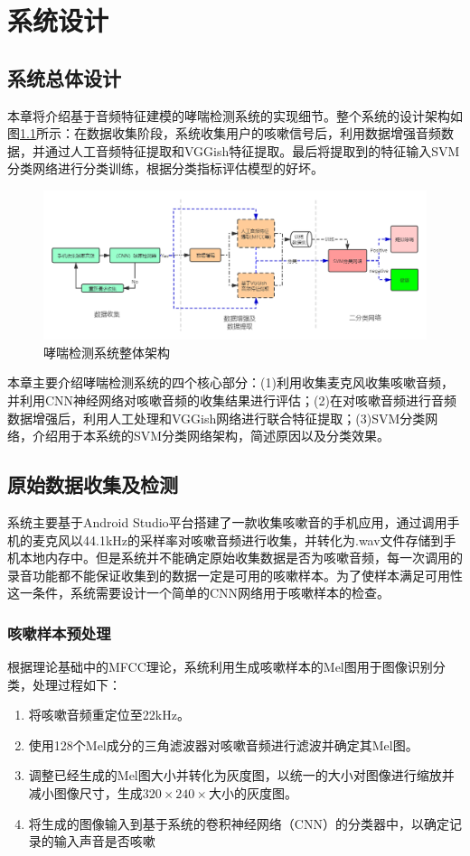 \chapter{系统设计}

\section{系统总体设计}
本章将介绍基于音频特征建模的哮喘检测系统的实现细节。整个系统的设计架构如图\ref{fig:jiagou}所示：在数据收集阶段，系统收集用户的咳嗽信号后，利用数据增强音频数据，并通过人工音频特征提取和VGGish特征提取。最后将提取到的特征输入SVM分类网络进行分类训练，根据分类指标评估模型的好坏。
\begin{figure}[h]
    \centering
    \includegraphics[width=\textwidth]{figures/哮喘检测系统架构.png}
    \caption{哮喘检测系统整体架构}
    \label{fig:jiagou}
\end{figure}

本章主要介绍哮喘检测系统的四个核心部分：(1)利用收集麦克风收集咳嗽音频，并利用CNN神经网络对咳嗽音频的收集结果进行评估；(2)在对咳嗽音频进行音频数据增强后，利用人工处理和VGGish网络进行联合特征提取；(3)SVM分类网络，介绍用于本系统的SVM分类网络架构，简述原因以及分类效果。
\section{原始数据收集及检测}
系统主要基于Android Studio平台搭建了一款收集咳嗽音的手机应用，通过调用手机的麦克风以44.1kHz的采样率对咳嗽音频进行收集，并转化为.wav文件存储到手机本地内存中。但是系统并不能确定原始收集数据是否为咳嗽音频，每一次调用的录音功能都不能保证收集到的数据一定是可用的咳嗽样本。为了使样本满足可用性这一条件，系统需要设计一个简单的CNN网络用于咳嗽样本的检查。

\subsection{咳嗽样本预处理}
根据理论基础中的MFCC理论，系统利用生成咳嗽样本的Mel图用于图像识别分类，处理过程如下：
\begin{enumerate}
    \item 将咳嗽音频重定位至22kHz。
    \item 使用128个Mel成分的三角滤波器对咳嗽音频进行滤波并确定其Mel图。
    \item 调整已经生成的Mel图大小并转化为灰度图，以统一的大小对图像进行缩放并减小图像尺寸，生成\(320\times240\times\)大小的灰度图。
    \item 将生成的图像输入到基于系统的卷积神经网络（CNN）的分类器中，以确定记录的输入声音是否咳嗽
\end{enumerate}

